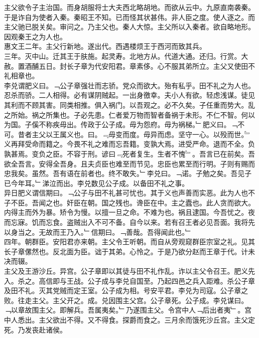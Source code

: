 \documentclass{zhvt-classic}
\begin{document}
\hspace*{2em}主父欲令子主治国。而身胡服将士大夫西北略胡地。而欲从云中。九原直南袭秦。于是诈自为使者入秦。秦昭王不知。已而怪其状甚伟。非人臣之度。使人逐之。而主父驰已脱关矣。审问之。乃主父也。秦人大惊。主父所以入秦者。欲自略地形。因观秦王之为人也。\\
\hspace*{2em}惠文王二年。主父行新地。遂出代。西遇楼烦王于西河而致其兵。\\
\hspace*{2em}三年。灭中山。迁其王于肤施。起灵寿。北地方从。代道大通。还归。行赏。大赦。置酒酺五日。封长子章为代安阳君。章素侈。心不服其弟所立。主父又使田不礼相章也。\\
\hspace*{2em}李兑谓肥义曰。﹁公子章强壮而志骄。党众而欲大。殆有私乎。田不礼之为人也。忍杀而骄。二人相得。必有谋阴贼起。一出身徼幸。夫小人有欲。轻虑浅谋。徒见其利而不顾其害。同类相推。俱入祸门。以吾观之。必不久矣。子任重而势大。乱之所始。祸之所集也。子必先患。仁者爱万物而智者备祸于未形。不仁不智。何以为国。子傒不称疾毋出。传政于公子成。毋为怨府。毋为祸梯。﹂肥义曰。﹁不可。昔者主父以王属义也。曰。﹃毋变而度。毋异而虑。坚守一心。以殁而世。﹄义再拜受命而籍之。今畏不礼之难而忘吾籍。变孰大焉。进受严命。退而不全。负孰甚焉。变负之臣。不容于刑。谚曰﹃死者复生。生者不愧﹄。吾言已在前矣。吾欲全吾言。安得全吾身。且夫贞臣也难至而节见。忠臣也累至而行明。子则有赐而忠我矣。虽然。吾有语在前者也。终不敢失。﹂李兑曰。﹁诺。子勉之矣。吾见子已今年耳。﹂涕泣而出。李兑数见公子成。以备田不礼之事。\\
\hspace*{2em}异日肥义谓信期曰。﹁公子与田不礼甚可忧也。其于义也声善而实恶。此为人也不子不臣。吾闻之也。奸臣在朝。国之残也。谗臣在中。主之蠹也。此人贪而欲大。内得主而外为暴。矫令为慢。以擅一旦之命。不难为也。祸且逮国。今吾忧之。夜而忘寐。饥而忘食。盗贼出入不可不备。自今以来。若有召王者必见吾面。我将先以身当之。无故而王乃入。﹂信期曰。﹁善哉。吾得闻此也。﹂\\
\hspace*{2em}四年。朝群臣。安阳君亦来朝。主父令王听朝。而自从旁观窥群臣宗室之礼。见其长子章傫然也。反北面为臣。诎于其弟。心怜之。于是乃欲分赵而王章于代。计未决而辍。\\
\hspace*{2em}主父及王游沙丘。异宫。公子章即以其徒与田不礼作乱。诈以主父令召王。肥义先入。杀之。高信即与王战。公子成与李兑自国至。乃起四邑之兵入距难。杀公子章及田不礼。灭其党贼而定王室。公子成为相。号安平君。李兑为司寇。公子章之败。往走主父。主父开之。成。兑因围主父宫。公子章死。公子成。李兑谋曰。﹁以章故围主父。即解兵。吾属夷矣。﹂乃遂围主父。令宫中人﹁后出者夷﹂。宫中人悉出。主父欲出不得。又不得食。探爵而食之。三月余而饿死沙丘宫。主父定死。乃发丧赴诸侯。\\
\end{document}
